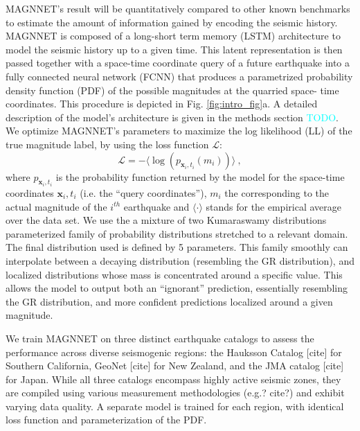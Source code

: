 \documentclass[pdflatex]{sn-jnl}
\newcommand{\neri}[1]{{\textcolor{cyan}{#1}}}
\begin{document}
MAGNNET's result will be quantitatively compared to other known benchmarks to estimate the amount of information gained by encoding the seismic history.
MAGNNET is composed of a long-short term memory (LSTM) architecture to model the seismic history up to a given time. This latent representation is then passed together with  a space-time coordinate query of a future earthquake into a fully connected neural network (FCNN) that produces a parametrized probability density function (PDF) of the possible magnitudes at the quarried space- time coordinates. This procedure is depicted in Fig. \ref{fig:intro_fig}a. A detailed description of the model's architecture is given in the methods section \neri{TODO}. We optimize MAGNNET's parameters to maximize the log likelihood (LL) of the true magnitude label, by using the loss function $\mathcal{L}$:
\begin{equation}
    \mathcal{L} = -\langle \log{ \left( p_{\textbf{x}_i, t_i} \left( m_i \right) \right) } \rangle\ ,
    \label{eq:loss_function}
\end{equation}
where $p_{\textbf{x}_i, t_i}$ is the probability function returned by the model for the space-time coordinates $\textbf{x}_i, t_i$ (i.e. the ``query coordinates''), $m_i$ the corresponding to the actual magnitude of the $i^{th}$ earthquake and $\langle \cdot\rangle$ stands for the empirical average over the data set. We use the a mixture of two Kumaraswamy distributions \cite{kumaraswamy_generalized_1980} parameterized family of probability distributions stretched to a relevant domain. The final distribution used is defined by 5 parameters. This family smoothly can interpolate between a decaying distribution (resembling the GR distribution), and localized distributions whose mass is concentrated around a specific value. This allows the model to output both an ``ignorant'' prediction, essentially resembling the GR distribution, and more confident predictions localized around a given magnitude.

We train MAGNNET on three distinct earthquake catalogs to assess the performance across diverse seismogenic regions: the Hauksson Catalog [cite] for Southern California, GeoNet [cite] for New Zealand, and the JMA catalog [cite] for Japan. While all three catalogs encompass highly active seismic zones, they are compiled using various measurement methodologies (e.g.? cite?) and exhibit varying data quality. A separate model is trained for each region, with identical loss function and parameterization of the PDF. 
\end{document}

